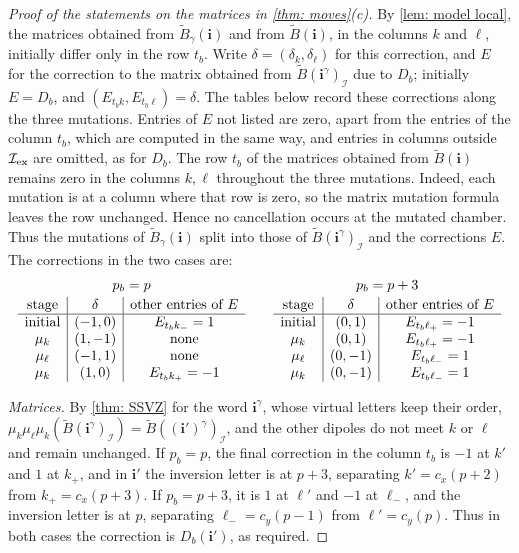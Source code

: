 \documentclass[a4paper]{amsart}
\numberwithin{equation}{section}
\theoremstyle{definition}
\theoremstyle{remark}
\newcommand{\mcI}{\mathcal{I}}
\newcommand{\bfi}{\mathbf{i}}
\newcommand{\tB}{\widetilde{B}}
\newcommand{\ex}{{\rm ex}}
\begin{document}
\begin{proof}[Proof of the statements on the matrices in \cref{thm: moves}(c)]
  By \cref{lem: model local}, the matrices obtained from $\tB_\gamma(\bfi)$ and from $\tB(\bfi)$, in the columns $k$ and $\ell$, initially differ only in the row $t_b$.
  Write $\delta=(\delta_k,\delta_\ell)$ for this correction, and $E$ for the correction to the matrix obtained from $\tB(\bfi^\gamma)_\mcI$ due to $D_b$; initially $E=D_b$, and $(E_{t_bk},E_{t_b\ell})=\delta$.
  The tables below record these corrections along the three mutations. Entries of $E$ not listed are zero, apart from the entries of the column $t_b$, which are computed in the same way, and entries in columns outside $\mcI_\ex$ are omitted, as for $D_b$.
  The row $t_b$ of the matrices obtained from $\tB(\bfi)$ remains zero in the columns $k,\ell$ throughout the three mutations.
  Indeed, each mutation is at a column where that row is zero, so the matrix mutation formula leaves the row unchanged.
  Hence no cancellation occurs at the mutated chamber.
  Thus the mutations of $\tB_\gamma(\bfi)$ split into those of $\tB(\bfi^\gamma)_\mcI$ and the corrections $E$.
  The corrections in the two cases are:
  \[
    \begin{array}{c|c|c}
      \multicolumn{3}{c}{p_b=p}\\[2pt]
      \text{stage}&\delta&\text{other entries of }E\\ \hline
      \text{initial}&(-1,0)&E_{t_bk_-}=1\\
      \mu_k&(1,-1)&\text{none}\\
      \mu_\ell&(-1,1)&\text{none}\\
      \mu_k&(1,0)&E_{t_bk_+}=-1
    \end{array}
    \qquad
    \begin{array}{c|c|c}
      \multicolumn{3}{c}{p_b=p+3}\\[2pt]
      \text{stage}&\delta&\text{other entries of }E\\ \hline
      \text{initial}&(0,1)&E_{t_b\ell_+}=-1\\
      \mu_k&(0,1)&E_{t_b\ell_+}=-1\\
      \mu_\ell&(0,-1)&E_{t_b\ell_-}=1\\
      \mu_k&(0,-1)&E_{t_b\ell_-}=1
    \end{array}
  \]

  \emph{Matrices.}
  By \cref{thm: SSVZ} for the word $\bfi^\gamma$, whose virtual letters keep their order, $\mu_k\mu_\ell\mu_k(\tB(\bfi^\gamma)_\mcI)=\tB((\bfi')^\gamma)_\mcI$, and the other dipoles do not meet $k$ or $\ell$ and remain unchanged.
  If $p_b=p$, the final correction in the column $t_b$ is $-1$ at $k'$ and $1$ at $k_+$, and in $\bfi'$ the inversion letter is at $p+3$, separating $k'=c_x(p+2)$ from $k_+=c_x(p+3)$.
  If $p_b=p+3$, it is $1$ at $\ell'$ and $-1$ at $\ell_-$, and the inversion letter is at $p$, separating $\ell_-=c_y(p-1)$ from $\ell'=c_y(p)$.
  Thus in both cases the correction is $D_b(\bfi')$, as required.
\end{proof}
\end{document}
